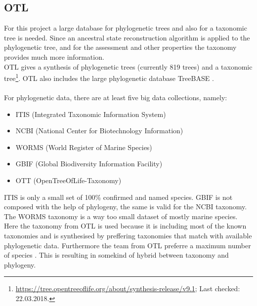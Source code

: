     \subsection{OTL}
      For this project a large database for phylogenetic trees and also for a taxonomic tree is needed. 
        Since an ancestral state reconstruction algorithm is applied to the phylogenetic tree, and for 
        the assessment and other properties the taxonomy provides much more information. \\
      OTL gives a synthesis of phylogenetic trees (currently 819 trees) and a taxonomic tree\footnote{
          \hyperlink{https://tree.opentreeoflife.org/about/synthesis-release/v9.1}
          {https://tree.opentreeoflife.org/about/synthesis-release/v9.1}; Last checked: 22.03.2018.
        }. OTL also 
        includes the large phylogenetic database TreeBASE \cite{Hinchliff2015}. \\
       \\
      For phylogenetic data, there are at least five big data collections, namely:
      \begin{itemize}
        \item ITIS (Integrated Taxonomic Information System) \cite{ITIS}
        \item NCBI (National Center for Biotechnology Information) \cite{NCBI1988}
        \item WORMS (World Register of Marine Species) \cite{WoRMS2018}
        \item GBIF (Global Biodiversity Information Facility) \cite{GBIF}
        \item OTT (OpenTreeOfLife-Taxonomy) \cite{Hinchliff2015}
      \end{itemize}
      ITIS is only a small set of 100\% confirmed and named species. GBIF is not composed with the help 
        of phylogeny, the same is valid for the NCBI taxonomy. The WORMS taxonomy is a way too small 
        dataset of mostly marine species. \\
      Here the taxonomy from OTL is used because it is including most of the known taxonomies and is 
        synthesised by preffering taxonomies that match with available phylogenetic data. Furthermore 
        the team from OTL preferre a maximum number of species \cite{Hinchliff2015}. This is resulting 
        in somekind of hybrid between taxonomy and phylogeny.  \\

